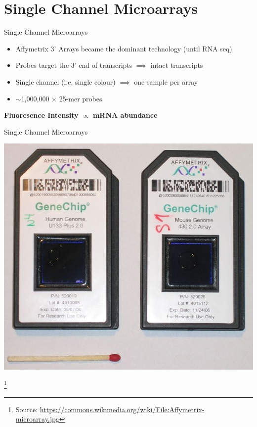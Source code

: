 \documentclass[aspectratio=169,11pt]{beamer}
\newcommand\blfootnote[1]{%
  \begingroup
  \renewcommand\thefootnote{}\footnote{#1}%
  \addtocounter{footnote}{-1}%
  \endgroup
}
\begin{document}
\section{Single Channel Microarrays}


\begin{frame}{Single Channel Microarrays}

	\begin{itemize}
		\item Affymetrix 3’ Arrays became the dominant technology (until RNA seq)
		\item Probes target the 3’ end of transcripts $\implies$ intact transcripts
		\item Single channel (i.e. single colour) $\implies$ one sample per array
		\item $\sim$1,000,000 $\times$ 25-mer probes
	\end{itemize}
	
	\begin{center}
		\textbf{Fluoresence Intensity $\propto$ mRNA abundance	}
	\end{center}

\end{frame}

\begin{frame}{Single Channel Microarrays}

	\begin{center}
	\includegraphics[scale=0.25]{figures/Affymetrix.jpg} 
	\end{center}
	
	\blfootnote{Source: \url{https://commons.wikimedia.org/wiki/File:Affymetrix-microarray.jpg}}

\end{frame}
\end{document}
